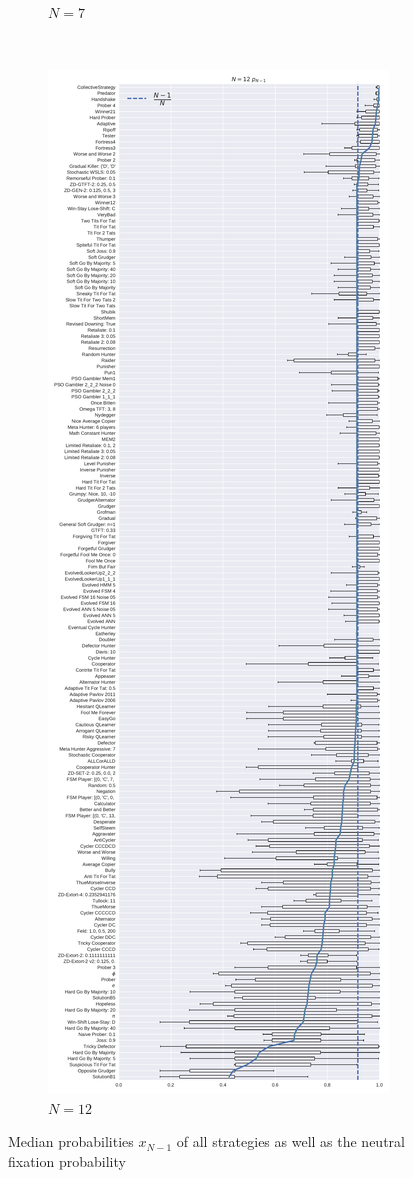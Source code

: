 \documentclass{article}
\begin{document}
\begin{figure}[!hbtp]
\begin{subfigure}[t]{.3\textwidth}
        \caption{\(N=7\)}
    \end{subfigure}%
    ~
    \begin{subfigure}[t]{.3\textwidth}
        \centering
        \includegraphics[width=\textwidth]{./img/boxplot_12_resist.pdf}
        \caption{\(N=12\)}
    \end{subfigure}%

    \caption{Median probabilities \(x_{N-1}\) of all strategies as well as the
    neutral fixation probability}
    \label{fig:fixation_boxplot_resist}
\end{figure}
\end{document}

